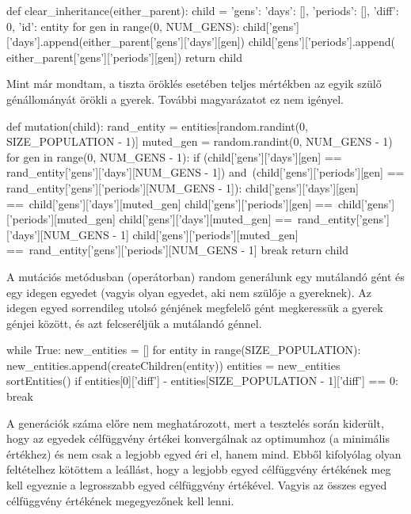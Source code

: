\documentclass[12pt,a4paper]{report}
\begin{document}
\begin{python}
def clear_inheritance(either_parent):
    child = {'gens': {'days': [], 'periods': []}, 
             'diff': 0, 'id': entity}
    for gen in range(0, NUM_GENS):
        child['gens']['days'].append(either_parent['gens']['days'][gen])
        child['gens']['periods'].append(
            either_parent['gens']['periods'][gen])
    return child
\end{python}

Mint már mondtam, a tiszta öröklés esetében teljes mértékben az egyik szülő génállományát örökli a gyerek. További magyarázatot ez nem igényel.

\begin{python}
def mutation(child):
    rand_entity = entities[random.randint(0, SIZE_POPULATION - 1)]
    muted_gen = random.randint(0, NUM_GENS - 1)
    for gen in range(0, NUM_GENS - 1):
        if (child['gens']['days'][gen] ==
           rand_entity['gens']['days'][NUM_GENS - 1]) and\
           (child['gens']['periods'][gen] ==
           rand_entity['gens']['periods'][NUM_GENS - 1]):
            child['gens']['days'][gen] ==\
                child['gens']['days'][muted_gen]
            child['gens']['periods'][gen] ==\
                child['gens']['periods'][muted_gen]
            child['gens']['days'][muted_gen] ==\
                rand_entity['gens']['days'][NUM_GENS - 1]
            child['gens']['periods'][muted_gen] ==\
                rand_entity['gens']['periods'][NUM_GENS - 1]
            break
    return child
\end{python}

A mutációs metódusban (operátorban) random generálunk egy mutálandó gént és egy idegen egyedet (vagyis olyan egyedet, aki nem szülője a gyereknek). Az idegen egyed sorrendileg utolsó génjének megfelelő gént megkeressük a gyerek génjei között, és azt felcseréljük a mutálandó génnel.

\begin{python}
while True:
    new_entities = []
    for entity in range(SIZE_POPULATION):
        new_entities.append(createChildren(entity))
    entities = new_entities
    sortEntities()
    if entities[0]['diff'] - entities[SIZE_POPULATION - 1]['diff'] == 0:
        break
\end{python}

A generációk száma előre nem meghatározott, mert a tesztelés során kiderült, hogy az egyedek célfüggvény értékei konvergálnak az optimumhoz (a minimális értékhez) és nem csak a legjobb egyed éri el, hanem mind. Ebből kifolyólag olyan feltételhez kötöttem a leállást, hogy a legjobb egyed célfüggvény értékének meg kell egyeznie a legrosszabb egyed célfüggvény értékével. Vagyis az összes egyed célfüggvény értékének megegyezőnek kell lenni.
\end{document}
